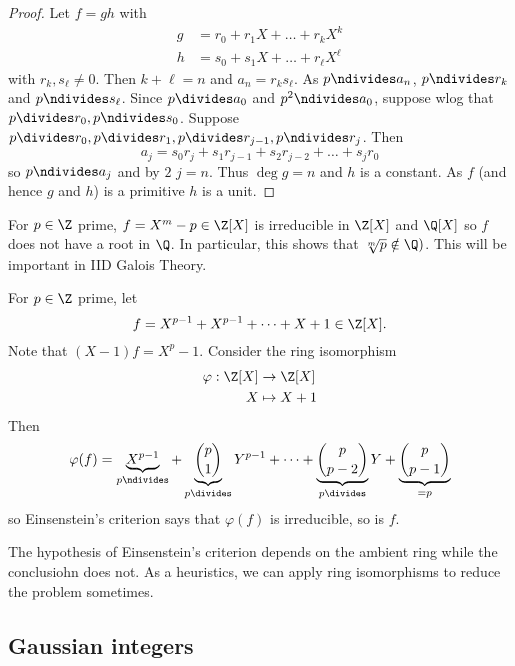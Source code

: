 \documentclass[a4paper]{article}
\theoremstyle{definition}
\begin{document}
\begin{proof}
  Let \(f = gh\) with
  \begin{align*}
    g &= r_0 + r_1X + \dots + r_kX^k \\
    h &= s_0 + s_1X + \dots + r_\ell X^\ell
  \end{align*}
  with \(r_k, s_\ell \neq 0\). Then \(k + \ell = n\) and \(a_n = r_ks_\ell\). As \(p \ndivides a_n\), \(p \ndivides r_k\) and \(p \ndivides s_\ell\). Since \(p \divides a_0\) and \(p^2 \ndivides a_0\), suppose wlog that \(p \divides r_0, p \ndivides s_0\). Suppose \(p \divides r_0, p \divides r_1, p \divides r_{j - 1}, p \ndivides r_j\). Then
  \[
    a_j = s_0r_j + s_1r_{j - 1} + s_2r_{j - 2} + \dots + s_j r_0
  \]
  so \(p \ndivides a_j\) and by \(2\) \(j = n\). Thus \(\deg g = n\) and \(h\) is a constant. As \(f\) (and hence \(g\) and \(h\)) is a primitive \(h\) is a unit.
\end{proof}

\begin{eg}
  For \(p \in \Z\) prime, \(f = X^m - p \in \Z[X]\) is irreducible in \(\Z[X]\) and \(\Q[X]\) so \(f\) does not have a root in \(\Q\). In particular, this shows that \(\sqrt[m]{p} \notin \Q)\). This will be important in IID Galois Theory.
\end{eg}

\begin{eg}
  For \(p \in \Z\) prime, let
  \[
    f = X^{p - 1} + X^{p - 1} + \dots + X + 1 \in \Z[X].
  \]
  Note that \((X - 1)f = X^p - 1\). Consider the ring isomorphism
  \begin{align*}
    \varphi: \Z[X] &\to \Z[X] \\
    X &\mapsto X + 1
  \end{align*}
  Then
  \[
    \varphi(f) = \underbrace{X^{p - 1}}_{p \ndivides} + \underbrace{\binom{p}{1}}_{p \divides} Y^{p - 1} + \dots + \underbrace{\binom{p}{p - 2}}_{p \divides} Y + \underbrace{\binom{p}{p - 1}}_{= p}
  \]
  so Einsenstein's criterion says that \(\varphi(f)\) is irreducible, so is \(f\).
\end{eg}

\begin{remark}
  The hypothesis of Einsenstein's criterion depends on the ambient ring while the conclusiohn does not. As a heuristics, we can apply ring isomorphisms to reduce the problem sometimes.
\end{remark}

\subsection{Gaussian integers}
\end{document}
